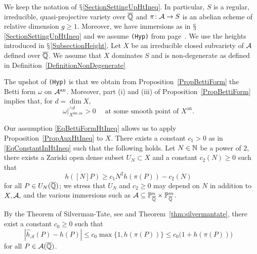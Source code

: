 

We keep the notation of $\mathsection$\ref{SectionSettingUpHtIneq}. In
particular, $S$ is a regular, irreducible, quasi-projective variety over ${\overline{\mathbb{Q}}}$ and
$\pi\colon\mathcal{A}\rightarrow S$ is an abelian scheme of relative dimension
$g \ge 1$. Moreover, we have immersions as in
$\mathsection$\ref{SectionSettingUpHtIneq} and we
assume {\tt (Hyp)} from page~\pageref{def:hyp}.
We use the heights introduced in $\mathsection$\ref{SubsectionHeight}. 
Let $X$ be an irreducible closed subvariety of $\mathcal{A}$ 
defined over ${\overline{\mathbb{Q}}}$. We assume that $X$ dominates $S$ and is
non-degenerate as defined in Definition~\ref{DefinitionNonDegenerate}

The upshot of {\tt (Hyp)} is that we obtain from Proposition~\ref{PropBettiForm} the Betti form $\omega$ on ${\mathcal{A}}^{\mathrm{an}}$. Moreover, part (i) and (iii) of Proposition~\ref{PropBettiForm} implies that, for $d = \dim X$, 
\begin{equation}\label{EqBettiFormHtIneq}
\omega|_{X^{\mathrm{sm},\mathrm{an}}}^{\wedge d} > 0 \quad \text{ at some smooth point of }X^{\mathrm{an}}.
\end{equation}


Our assumption \eqref{EqBettiFormHtIneq} allows us to apply
Proposition~\ref{PropAuxHtIneq} to
$X$. 
 There exists a constant $c_1>0$ as in \eqref{EqConstantInHtIneq} such
 that the following holds. Let $N\in{\mathbb{N}}$ be a power of $2$, there
 exists a Zariski open dense subset $U_N\subset X$ and a constant
 $c_2(N)\ge 0$ such that
\begin{equation}\label{EquationHeight1}
h([N]P) \ge c_1 N^2 h(\pi(P)) - c_2(N)
\end{equation}
for all $P\in U_N({\overline{\mathbb{Q}}})$; we stress that $U_N$ and 
 $c_2\ge 0$ may depend  on $N$ in addition to $X,\mathcal{A},$ and the various
 immersions such as $\mathcal{A} \subseteq {\mathbb{P}}_{\overline{\mathbb{Q}}}^n \times {\mathbb{P}}_{\overline{\mathbb{Q}}}^m$.


By the  Theorem of Silverman-Tate, see \cite[Theorem~A]{Silverman} and
Theorem~\ref{thm:silvermantate}, there exist a  constant
$c_0\ge 0$ %
 such that
\begin{equation}
\label{EquationHeight2}
|\hat{h}_{\mathcal{A}}(P)-h(P)| \le
c_0\max\{1,h(\pi(P))\}\le c_0\bigl(1+h(\pi(P))\bigr)
\end{equation}
for all $P\in \mathcal{A}({\overline{\mathbb{Q}}})$.


